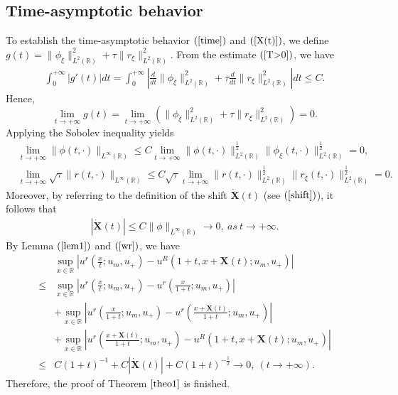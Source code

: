 \documentclass[10pt,reqno]{amsart}
\numberwithin{equation}{section}
\begin{document}
	\subsection{Time-asymptotic behavior}
	To establish the time-asymptotic behavior $(\ref{time})$ and $(\ref{X(t)})$, we define $g(t)=\lVert\phi_{\xi}\rVert_{L^{2}(\mathbb{R})}^2+\tau\lVert r_{\xi}\rVert_{L^{2}(\mathbb{R})}^2$. From the estimate $(\ref{T>0})$, we have
	\begin{align*}
		\int_{0}^{+\infty} |g'(t)| dt = \int_{0}^{+\infty} \left|\frac{d}{dt} \|\phi_{\xi}\|_{L^2(\mathbb{R})}^{2}+\tau\frac{d}{dt} \|r_{\xi}\|_{L^2(\mathbb{R})}^{2}\right| dt\leq C.
	\end{align*}
	Hence, $$\lim_{t \to +\infty}g(t)=\lim_{t \to +\infty}\left(\lVert\phi_{\xi}\rVert_{L^{2}(\mathbb{R})}^2+\tau\lVert r_{\xi}\rVert_{L^{2}(\mathbb{R})}^2\right)=0.$$
	Applying the Sobolev inequality yields
	\begin{align*}
		&\lim_{t \to +\infty} \|\phi(t, \cdot)\|_{L^{\infty}(\mathbb{R})} \leq C\lim_{t \to +\infty}  \|\phi(t, \cdot)\|_{L^2(\mathbb{R})}^{\frac{1}{2}} \|\phi_{\xi}(t, \cdot)\|_{L^2(\mathbb{R})}^{\frac{1}{2}} = 0,\\
		&\lim_{t \to +\infty} \sqrt{\tau}\|r(t, \cdot)\|_{L^{\infty}(\mathbb{R})} \leq C\sqrt{\tau}\lim_{t \to +\infty}  \|r(t, \cdot)\|_{L^2(\mathbb{R})}^{\frac{1}{2}} \|r_{\xi}(t, \cdot)\|_{L^2(\mathbb{R})}^{\frac{1}{2}} = 0.
	\end{align*}
	Moreover, by referring to the definition of the shift $\dot{\mathbf{X}}(t)$ (see $(\ref{shift})$), it follows that
	\begin{align*}
		|\dot{\mathbf{X}}(t)| \leq C \|\phi\|_{L^{\infty}(\mathbb{R})}\to 0, \ as\ t\to +\infty.
	\end{align*}
	By Lemma $(\ref{lem1})$ and $(\ref{wr})$, we have 
	\begin{align*}
		&\sup_{x \in \mathbb{R}} \left| u^{r} \left(\frac{x}{t}; u_{m}, u_{+}\right) - u^{R} \left(1 + t, x + \mathbf{X}(t); u_{m}, u_{+}\right) \right|\\
		\leq& \sup_{x \in \mathbb{R}} \left| u^{r} \left(\frac{x}{t}; u_{m}, u_{+}\right) - u^{r} \left(\frac{x}{1+t}; u_{m}, u_{+}\right) \right|\\
		&+ \sup_{x \in \mathbb{R}} \left| u^{r} \left(\frac{x}{1+t}; u_{m}, u_{+}\right) - u^{r} \left(\frac{x + \mathbf{X}(t)}{1+t}; u_{m}, u_{+}\right) \right|\\
		&+ \sup_{x \in \mathbb{R}} \left| u^{r} \left(\frac{x + \mathbf{X}(t)}{1+t}; u_{m}, u_{+}\right) - u^{R} \left(1 + t, x + \mathbf{X}(t); u_{m}, u_{+}\right) \right|\\
		\leq&C(1 + t)^{-1}+C\left|\dot{\mathbf{X}}(t)\right|+C(1+t)^{-\frac{1}{2}}
		\to0, \ (t\to+\infty).
	\end{align*}
	Therefore, the proof of Theorem $\ref{theo1}$ is finished.
	
\end{document}

